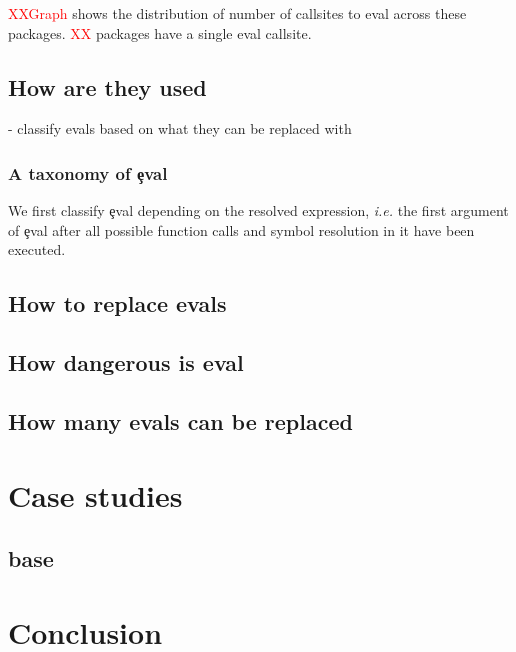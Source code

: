 \documentclass[conference]{IEEEtran}
\newcommand{\missingNumber}{\textcolor{red}{XX}\xspace}
\newcommand{\missingGraph}{\textcolor{red}{XXGraph}\xspace}
\begin{document}
\missingGraph shows the distribution of number of callsites to eval across these
packages. \missingNumber packages have a single eval callsite.


\subsection{How are they used}

- classify evals based on what they can be replaced with

\subsubsection{A taxonomy of \c{eval}}

We first classify \c{eval} depending on the resolved expression, \emph{i.e.}
the first argument of \c{eval} after all possible function calls and symbol
resolution in it have been executed.



\subsection{How to replace evals}


\subsection{How dangerous is eval}

\subsection{How many evals can be replaced}

\section{Case studies}

\subsection{base}


\section{Conclusion}



\end{document}
